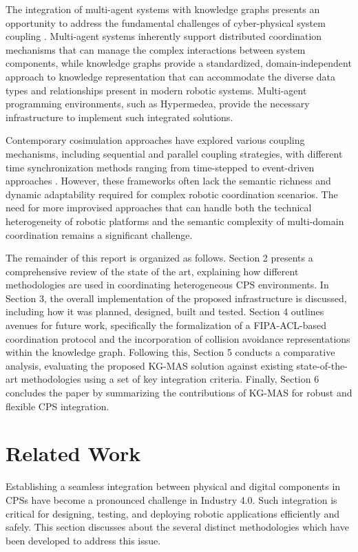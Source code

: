 \documentclass{article} %
\begin{document}
The integration of multi-agent systems with knowledge graphs presents an opportunity to address the fundamental challenges of cyber-physical system coupling \cite{crooks2011integration}. Multi-agent systems inherently support distributed coordination mechanisms that can manage the complex interactions between system components, while knowledge graphs provide a standardized, domain-independent approach to knowledge representation that can accommodate the diverse data types and relationships present in modern robotic systems. Multi-agent programming environments, such as Hypermedea, provide the necessary infrastructure to implement such integrated solutions\cite{charpenay2022hypermedea}.

Contemporary cosimulation approaches have explored various coupling mechanisms, including sequential and parallel coupling strategies, with different time synchronization methods ranging from time-stepped to event-driven approaches \cite{hafner2013investigation, mindra2024cyber}. However, these frameworks often lack the semantic richness and dynamic adaptability required for complex robotic coordination scenarios. The need for more improvised approaches that can handle both the technical heterogeneity of robotic platforms and the semantic complexity of multi-domain coordination remains a significant challenge.

The remainder of this report is organized as follows. Section 2 presents a comprehensive review of the state of the art, explaining how different methodologies are used in coordinating heterogeneous CPS environments. In Section 3, the overall implementation of the proposed infrastructure is discussed, including how it was planned, designed, built and tested. Section 4 outlines avenues for future work, specifically the formalization of a FIPA-ACL-based coordination protocol and the incorporation of collision avoidance representations within the knowledge graph. Following this, Section 5 conducts a comparative analysis, evaluating the proposed KG-MAS solution against existing state-of-the-art methodologies using a set of key integration criteria. Finally, Section 6 concludes the paper by summarizing the contributions of KG-MAS for robust and flexible CPS integration.

\section{Related Work}
 Establishing a seamless integration between physical and digital components in CPSs have become a pronounced challenge in Industry 4.0. Such integration is critical for designing, testing, and deploying robotic applications efficiently and safely. This section discusses about the several distinct methodologies which have been developed to address this issue.
\end{document}

